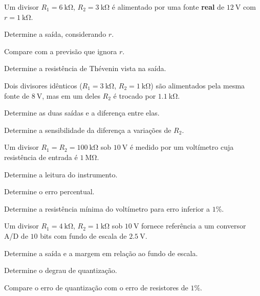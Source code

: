 \blocoaprofundamento
\begin{questao}[3]{}

Um divisor $R_1=\SI{6}{\kilo\ohm}$, $R_2=\SI{3}{\kilo\ohm}$ é alimentado por
uma fonte \textbf{real} de $\SI{12}{\volt}$ com $r=\SI{1}{\kilo\ohm}$.
\begin{itensq}
\item Determine a saída, considerando $r$.
\item Compare com a previsão que ignora $r$.
\item Determine a resistência de Thévenin vista na saída.
\end{itensq}


\end{questao}
\begin{questao}[3]{}

Dois divisores idênticos ($R_1=\SI{3}{\kilo\ohm}$, $R_2=\SI{1}{\kilo\ohm}$)
são alimentados pela mesma fonte de $\SI{8}{\volt}$, mas em um deles $R_2$ é
trocado por $\SI{1.1}{\kilo\ohm}$.
\begin{itensq}
\item Determine as duas saídas e a diferença entre elas.
\item Determine a sensibilidade da diferença a variações de $R_2$.
\end{itensq}


\end{questao}
\begin{questao}[3]{}

Um divisor $R_1=R_2=\SI{100}{\kilo\ohm}$ sob $\SI{10}{\volt}$ é medido por um
voltímetro cuja resistência de entrada é $\SI{1}{\mega\ohm}$.
\begin{itensq}
\item Determine a leitura do instrumento.
\item Determine o erro percentual.
\item Determine a resistência mínima do voltímetro para erro inferior a
      $1\%$.
\end{itensq}


\end{questao}
\begin{questao}[3]{}

Um divisor $R_1=\SI{4}{\kilo\ohm}$, $R_2=\SI{1}{\kilo\ohm}$ sob
$\SI{10}{\volt}$ fornece referência a um conversor A/D de $10$ bits com fundo
de escala de $\SI{2.5}{\volt}$.
\begin{itensq}
\item Determine a saída e a margem em relação ao fundo de escala.
\item Determine o degrau de quantização.
\item Compare o erro de quantização com o erro de resistores de $1\%$.
\end{itensq}


\end{questao}
